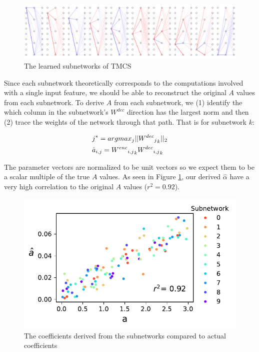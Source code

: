 \documentclass{article}
\theoremstyle{plain}
\theoremstyle{definition}
\theoremstyle{remark}
\begin{document}
\begin{figure}[htbp]
    \centerline{\includegraphics[width=\textwidth]{../figures/5_circuit_superposition_decomposition.pdf}}
    \centering
    \caption{The learned subnetworks of TMCS}\label{fig:5_circuit_superposition_decomposition}
\end{figure}


Since each subnetwork theoretically corresponds to the computations involved with a single input feature, we should be able to reconstruct the original $A$ values from each subnetwork. To derive $A$ from each subnetwork, we (1) identify the which column in the subnetwork's $W^{dec}$ direction has the largest norm and then (2) trace the weights of the network through that path. That is for subnetwork $k$: 

\begin{align}
    &j^* = argmax_{j} ||{{{W^{dec}}_j}_k}||_2 \\
    &\hat{a}_{i,j} = {{{W^{enc}}_{i,j}}}_k {{W^{dec}}_{i,j}}_k \notag
\end{align}

The parameter vectors are normalized to be unit vectors so we expect them to be a scalar multiple of the true $A$ values. As seen in Figure \ref{fig:5_circuit_superposition_decomposition}, our derived $\hat{\alpha}$ have a very high correlation to the original $A$ values ($r^2 = 0.92$).



\begin{figure}[htbp]
    \centerline{\includegraphics[width=\columnwidth]{../figures/6_circuit_superposition_coefficients.pdf}}
    \centering
    \caption{The coefficients derived from the subnetworks compared to actual coefficients}\label{fig:6_circuit_superposition_coefficients}
\end{figure}
\end{document}

